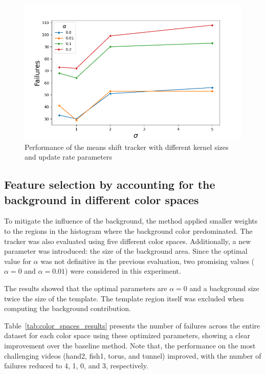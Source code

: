 \documentclass[9pt]{IEEEtran}
\begin{document}
\begin{figure}[h]
  \centering
  \includegraphics[width=0.99\columnwidth]{figures/sigma_alpha.png}
  \caption{Performance of the means shift tracker with different kernel sizes and update rate
  parameters}
  \label{fig:params2}
\end{figure}

\subsection{Feature selection by accounting for the background in different color spaces}
To mitigate the influence of the background, the method applied smaller weights to the regions in the histogram where
 the background color predominated. The tracker was also evaluated using five different color spaces. Additionally,
  a new parameter was introduced: the size of the background area. Since the optimal value for $\alpha$ was not definitive
   in the previous evaluation, two promising values ($\alpha = 0$ and $\alpha = 0.01$) were considered in this experiment.

The results showed that the optimal parameters are $\alpha = 0$ and a background size twice the size of the template. 
The template region itself was excluded when computing the background contribution.

Table~\ref{tab:color_spaces_results} presents the number of failures across the entire dataset for each color 
space using these optimized parameters, showing a clear improvement over the baseline method. Note that,
 the performance
 on the most challenging videos (hand2, fish1, torus, and tunnel) improved, with the number of failures
  reduced to 4, 1, 0, and 3, respectively. 
\end{document}
